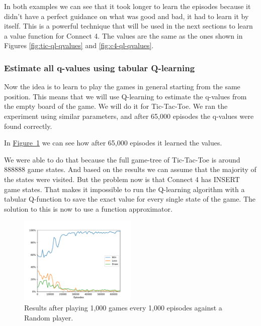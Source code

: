 \documentclass{article}
\newcommand{\GithubURL}[1]{[\href{https://github.com/davidrobles/mlnd-capstone-code/blob/master/#1}{source}]}
\begin{document}

In both examples we can see that it took longer to learn the episodes because it didn't have a
perfect guidance on what was good and bad, it had to learn it by itself. This is a powerful
technique that will be used in the next sections to learn a value function for Connect 4. The values
are the same as the ones shown in Figures \hyperref[fig:tic-ql-qvalues]{\ref*{fig:tic-ql-qvalues}}
and \hyperref[fig:c4-ql-qvalues]{\ref*{fig:c4-ql-qvalues}}.

\subsubsection{Estimate all q-values using tabular Q-learning}


Now the idea is to learn to play the games in general starting from the same position. This means
that we will use Q-learning to estimate the q-values from the empty board of the game. We will do it
for Tic-Tac-Toe. We ran the experiment using similar parameters, and after 65,000 episodes the
q-values were found correctly.


In \hyperref[fig:tic-ql-tab-full-wld-plot]{Figure~\ref*{fig:tic-ql-tab-full-wld-plot}} we can see
how after 65,000 episodes it learned the values.

We were able to do that because the full game-tree of Tic-Tac-Toe is around 888888 game states. And
based on the results we can assume that the majority of the states were visited. But the problem now
is that Connect 4 has INSERT game states. That makes it impossible to run the Q-learning algorithm
with a tabular Q-function to save the exact value for every single state of the game. The solution
to this is now to use a function approximator.

\begin{figure}[!h]
    \centering
    \includegraphics[width=0.50\textwidth]{figures/tic_ql_tab_full_wld_plot.pdf}
    \caption{Results after playing 1,000 games every 1,000 episodes against a Random player.}
    \label{fig:tic-ql-tab-full-wld-plot}
\end{figure}
\end{document}

